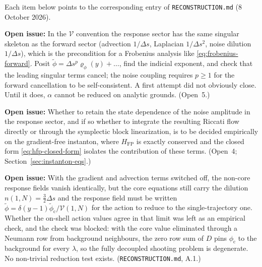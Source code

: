 \documentclass[a4paper,11pt]{article}
\newcommand{\semibold}[1]{{\fontseries{b}\selectfont{#1}}}
\renewcommand{\geq}{\geqslant}
\newenvironment{todo}{\begin{tcolorbox}[enhanced,breakable,colback=SussexBurntOrange!10,colframe=SussexBurntOrange!40]\small{\textsf{\textbf{Open issue:} }}}{\end{tcolorbox}}
\newcommand{\Ny}{N}                          %
\newcommand{\field}{\phi}                    %
\newcommand{\rfield}{\widetilde\field}       %
\newcommand{\yco}{y}                         %
\newcommand{\Deltas}{\Delta s}                %
\newcommand{\ncount}{n}                      %
\newcommand{\volel}{\mathcal{V}}             %
\newcommand{\Sigvol}[1]{\varSigma_{#1}}      %
\newcommand{\Hfp}{H_{\mathrm{FP}}}            %
\newcommand{\core}{\mathrm{c}}                %
\newcommand{\lag}{\lambda}                   %
\begin{document}
Each item below points to the corresponding entry of
\texttt{RECONSTRUCTION.md} (8 October 2026).

\begin{todo}
\semibold{Indicial analysis of the response sector at $\Deltas\to0$.} In
the $\volel$ convention the response sector has the same singular skeleton
as the forward sector (advection $1/\Deltas$, Laplacian $1/\Deltas^2$,
noise dilution $1/\Deltas$), which is the precondition for a Frobenius
analysis like \eqref{eq:frobenius-forward}. Posit
$\rfield=\Deltas^{p}\varrho_\field(\yco)+\dots$, find the indicial exponent,
and check that the leading singular terms cancel; the noise coupling
requires $p\geq1$ for the forward cancellation to be self-consistent. A
first attempt did not obviously close. Until it does, $\alpha$ cannot be
reduced on analytic grounds. (Open~5.)
\end{todo}

\begin{todo}
\semibold{The $\partial\Sigvol{}/\partial u$ decision.} Whether to retain
the state dependence of the noise amplitude in the response sector, and
if so whether to integrate the resulting Riccati flow directly or through
the symplectic block linearization, is to be decided empirically on the
gradient-free instanton, where $\Hfp$ is exactly conserved and the
closed form \eqref{eq:hfp-closed-form} isolates the contribution of these
terms. (Open~4; Section~\ref{sec:instanton-eqs}.)
\end{todo}

\begin{todo}
\semibold{The decoupled limit and the missing reduction test.} With the
gradient and advection terms switched off, the non-core response fields
vanish identically, but the core equations still carry the dilution
$\ncount(1,\Ny)=\tfrac32\Deltas$ and the response field must be written
$\rfield=\delta(\yco-1)\rfield_\core/\volel(1,\Ny)$ for the action to reduce
to the single-trajectory one. Whether the on-shell action values agree in
that limit was left as an empirical check, and the check was blocked: with
the core value eliminated through a Neumann row from background
neighbours, the zero row sum of $D$ pins $\field_\core$ to the background
for every $\lag$, so the fully decoupled shooting problem is degenerate.
No non-trivial reduction test exists. (\texttt{RECONSTRUCTION.md}, A.1.)
\end{todo}
\end{document}
